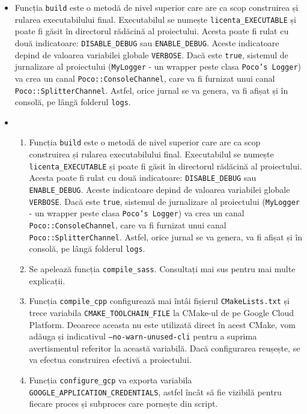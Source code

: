 \begin{itemize}
\begin{itemize}
        \item Funcția \texttt{build} este o metodă de nivel superior care are ca scop construirea și rularea executabilului final. Executabilul se numește \texttt{licenta\_EXECUTABLE} și poate fi găsit în directorul rădăcină al proiectului. Acesta poate fi rulat cu două indicatoare: \texttt{DISABLE\_DEBUG} sau \texttt{ENABLE\_DEBUG}. Aceste indicatoare depind de valoarea variabilei globale \texttt{VERBOSE}. Dacă este \texttt{true}, sistemul de jurnalizare al proiectului (\texttt{MyLogger} - un wrapper peste clasa \texttt{Poco's Logger}) va crea un canal \texttt{Poco::ConsoleChannel}, care va fi furnizat unui canal \texttt{Poco::SplitterChannel}. Astfel, orice jurnal se va genera, va fi afișat și în consolă, pe lângă folderul \texttt{logs}.
        \item \begin{enumerate}
            \item Funcția \texttt{build} este o metodă de nivel superior care are ca scop construirea și rularea executabilului final. Executabilul se numește \texttt{licenta\_EXECUTABLE} și poate fi găsit în directorul rădăcină al proiectului. Acesta poate fi rulat cu două indicatoare: \texttt{DISABLE\_DEBUG} sau \texttt{ENABLE\_DEBUG}. Aceste indicatoare depind de valoarea variabilei globale \texttt{VERBOSE}. Dacă este \texttt{true}, sistemul de jurnalizare al proiectului (\texttt{MyLogger} - un wrapper peste clasa \texttt{Poco's Logger}) va crea un canal \texttt{Poco::ConsoleChannel}, care va fi furnizat unui canal \texttt{Poco::SplitterChannel}. Astfel, orice jurnal se va genera, va fi afișat și în consolă, pe lângă folderul \texttt{logs}.
            \item Se apelează funcția \texttt{compile\_sass}. Consultați mai sus pentru mai multe explicații.
            \item Funcția \texttt{compile\_cpp} configurează mai întâi fișierul \texttt{CMakeLists.txt} și trece variabila \texttt{CMAKE\_TOOLCHAIN\_FILE} la CMake-ul de pe Google Cloud Platform. Deoarece aceasta nu este utilizată direct în acest CMake, vom adăuga și indicativul \texttt{--no-warn-unused-cli} pentru a suprima avertismentul referitor la această variabilă. Dacă configurarea reușește, se va efectua construirea efectivă a proiectului.
            \item Funcția \texttt{configure\_gcp} va exporta variabila \texttt{GOOGLE\_APPLICATION\_CREDENTIALS}, astfel încât să fie vizibilă pentru fiecare proces și subproces care pornește din script.
        \end{enumerate}
    \end{itemize}
\end{itemize}

